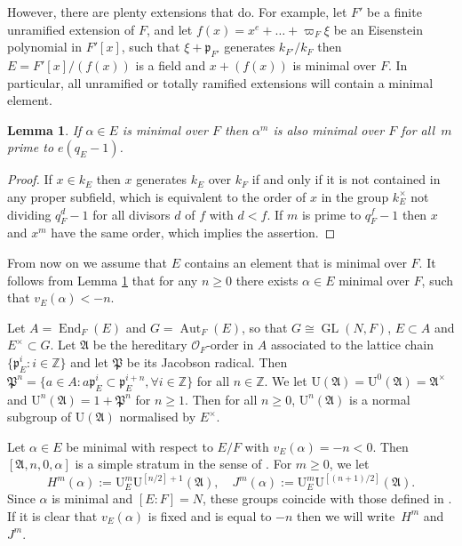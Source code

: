 \documentclass[JEP,XML,SOM,Unicode,NoEqCountersInSection]{cedram}
\let\mathcal\mathscr
\newtheorem{lem}[prop]{Lemma}
\theoremstyle{definition}
\DeclareMathOperator{\Aut}{Aut}
\DeclareMathOperator{\End}{End}
\DeclareMathOperator{\GL}{GL}
\newcommand{\ZZ}{\mathbb Z}
\newcommand{\Aa}{\mathfrak A}
\newcommand{\Pp}{\mathfrak P}
\newcommand{\cO}{\mathcal{O}}
\newcommand{\pp}{\mathfrak p}
\newcommand{\UU}{\mathrm U}
\begin{document}
However, there are plenty extensions that do. For example, let $F'$ be a finite unramified extension of $F$,
and let $f(x)=x^e+\ldots + \varpi_F \xi$ be an Eisenstein polynomial in $F'[x]$, such that $\xi +\pp_{F'}$ generates $k_{F'}/k_F$ then $E=F'[x]/(f(x))$ is a
field and $x +(f(x))$ is minimal over $F$. In particular, all unramified or totally ramified extensions will contain a minimal element.

\begin{lem}\label{many_min} If $\alpha\in E$ is minimal over $F$ then $\alpha^m$ is also minimal over $F$ for all~$m$ prime to $e(q_E-1)$.
\end{lem}

\begin{proof} If $x\in k_E$ then $x$ generates $k_E$ over $k_F$ if and only if it is not contained in any proper subfield, which
is equivalent to the order of $x$ in the group $k_E^{\times}$ not dividing $q_F^d-1$ for all divisors $d$ of $f$ with $d<f$.
If $m$ is prime to $q_F^f-1$ then $x$ and $x^m$ have the same order, which implies the assertion.
\end{proof}

From now on we assume that $E$ contains an element that is minimal over $F$. It follows from Lemma \ref{many_min} that for any $n\ge 0$ there
exists $\alpha\in E$ minimal over $F$, such that $v_E(\alpha)< -n$.

Let $A=\End_F(E)$ and $G=\Aut_F(E)$, so that $G\cong \GL(N, F)$, $E\subset A$ and $E^{\times}\subset G$. Let $\mathfrak A$ be the hereditary $\cO_F$-order in $A$ associated to
the lattice chain $\{\pp_E^i: i\in \ZZ\}$ and let $\Pp$ be its Jacobson radical. Then $\Pp^n = \{a\in A: a \pp_E^i\subset \pp_E^{i+n}, \forall i\in \ZZ\}$ for all $n\in \ZZ$.
We let $\UU(\Aa)=\UU^0(\Aa)= \Aa^{\times}$ and $\UU^n(\Aa)=1+ \Pp^n$ for $n\ge 1$. Then for all $n\ge 0$, $\UU^n(\Aa)$ is a normal subgroup of $\UU(\Aa)$ normalised by $E^{\times}$.

Let $\alpha\in E$ be minimal with respect to $E/F$ with $v_E(\alpha)=-n<0$. Then $[\Aa, n, 0, \alpha]$ is a simple stratum in the sense of \cite[(1.5.5)]{BK}. For $m\ge 0$, we let
\[
H^{m}(\alpha):= \UU_E^m \UU^{[n/2]+1}(\Aa), \quad J^m(\alpha):= \UU_E^m \UU^{[(n+1)/2]}(\Aa).
\]
Since $\alpha$ is minimal and $[E:F]=N$, these groups coincide with those defined in \hbox{\cite[(3.1.14)]{BK}}. If it is clear that $v_E(\alpha)$ is fixed and is equal to $-n$ then we will
write~$H^{m}$ and $J^m$.
\end{document}
